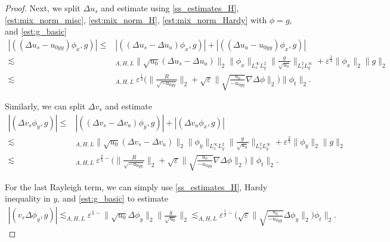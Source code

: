 \documentclass[10pt,a4paper]{amsart}
\begin{document}
\begin{proof}
Next, we split $\Delta u_s$ and estimate using \eqref{ss_estimates_H}, \eqref{est:mix_norm_misc}, \eqref{est:mix_norm_H}, \eqref{est:mix_norm_Hardy} with $\phi = g$, and \eqref{est:g_basic}
\begin{equation}\label{Dual_4}
\begin{aligned}
|((\Delta u_s - u_{0yy}) \phi_x, g)| \le& |((\Delta u_s - \Delta u_a) \phi_x, g) | + |((\Delta u_a - u_{0yy}) \phi_x, g) |\\
\lesssim&_{A,H,L} \| \sqrt{u_0} (\Delta u_s - \Delta u_a)\|_2 \| \phi_x\|_{L^\infty_x L^2_y} \| \frac{g}{\sqrt{u_0}}\|_{L^2_x L^\infty_y} + \varepsilon^{\frac{1}{3}}\|\phi_x\|_2\|g\|_2\\
\lesssim&_{A,H,L}~ \varepsilon^{\frac{1}{3}}  \Big( \|\frac{R}{\sqrt{-u_{0yy}}}\|_2 + \sqrt{\varepsilon} \| \sqrt{\frac{u_0}{-u_{0yy}}} \nabla \Delta \phi\|_2\Big) \|\phi_t\|_2.
\end{aligned}
\end{equation}

Similarly, we can split $\Delta v_s$ and estimate
\begin{equation}\label{Dual_5}
\begin{aligned}
|(\Delta v_s \phi_y, g)| \le& |((\Delta v_s - \Delta v_a) \phi_y, g) | + |(\Delta v_a  \phi_x, g) |\\
\lesssim&_{A,H,L} \| \sqrt{u_0} (\Delta v_s - \Delta v_a)\|_2 \| \phi_y\|_{L^\infty_x L^2_y} \| \frac{g}{\sqrt{u_0}}\|_{L^2_x L^\infty_y} + \varepsilon^{\frac{2}{3}}\|\phi_y\|_2\|g\|_2\\
\lesssim&_{A,H,L}~ \varepsilon^{\frac{2}{3}-}  \Big( \|\frac{R}{\sqrt{-u_{0yy}}}\|_2 + \sqrt{\varepsilon} \| \sqrt{\frac{u_0}{-u_{0yy}}} \nabla \Delta \phi\|_2\Big) \|\phi_t\|_2.
\end{aligned}
\end{equation}

For the last Rayleigh term, we can simply use \eqref{ss_estimates_H}, Hardy inequality in $y$, and \eqref{est:g_basic} to estimate
\begin{equation}\label{Dual_6}
\begin{aligned}
|( v_s \Delta\phi_y, g)| \lesssim_{A,H,L} \varepsilon^{1-} \| \sqrt{u_0} \Delta \phi_y\|_2\| \frac{g}{\sqrt{u_0}}\|_2 \lesssim_{A,H,L} \varepsilon^{\frac{1}{2}-} \Big( \sqrt{\varepsilon} \| \sqrt{\frac{u_0}{-u_{0yy}}}  \Delta \phi_y\|_2\Big)\phi_t\|_2.
\end{aligned}
\end{equation}


\end{proof}
\end{document}
